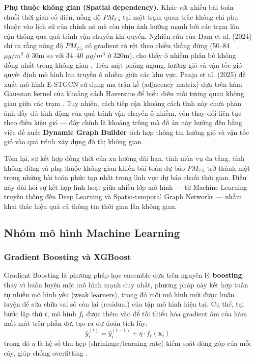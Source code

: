 \textbf{Phụ thuộc không gian (Spatial dependency).} Khác với nhiều bài toán chuỗi thời gian cổ điển, nồng độ $PM_{2.5}$ tại một trạm quan trắc không chỉ phụ thuộc vào lịch sử của chính nó mà còn chịu ảnh hưởng mạnh bởi các trạm lân cận thông qua quá trình vận chuyển khí quyển. Nghiên cứu của Dam et al. (2024) chỉ ra rằng nồng độ $PM_{2.5}$ có gradient rõ rệt theo chiều thẳng đứng (50--84 $\mu g/m^3$ ở 30m so với 34--40 $\mu g/m^3$ ở 320m), cho thấy ô nhiễm phân bố không đồng nhất trong không gian \cite{dam2024pm25}. Trên mặt phẳng ngang, hướng gió và vận tốc gió quyết định mô hình lan truyền ô nhiễm giữa các khu vực. Panja et al. (2025) đề xuất mô hình E-STGCN sử dụng ma trận kề (adjacency matrix) dựa trên hàm Gaussian kernel của khoảng cách Haversine để biểu diễn mối tương quan không gian giữa các trạm \cite{panja2025estgcn}. Tuy nhiên, cách tiếp cận khoảng cách tĩnh này chưa phản ánh đầy đủ tính động của quá trình vận chuyển ô nhiễm, vốn thay đổi liên tục theo điều kiện gió — đây chính là khoảng trống mà đồ án này hướng đến bằng việc đề xuất \textbf{Dynamic Graph Builder} tích hợp thông tin hướng gió và vận tốc gió vào quá trình xây dựng đồ thị không gian.

Tóm lại, sự kết hợp đồng thời của xu hướng dài hạn, tính mùa vụ đa tầng, tính không dừng và phụ thuộc không gian khiến bài toán dự báo $PM_{2.5}$ trở thành một trong những bài toán phức tạp nhất trong lĩnh vực dự báo chuỗi thời gian. Điều này đòi hỏi sự kết hợp linh hoạt giữa nhiều lớp mô hình — từ Machine Learning truyền thống đến Deep Learning và Spatio-temporal Graph Networks — nhằm khai thác hiệu quả cả thông tin thời gian lẫn không gian.

\subsection{Nhóm mô hình Machine Learning}
\subsubsection{Gradient Boosting và XGBoost}

Gradient Boosting là phương pháp học ensemble dựa trên nguyên lý \textbf{boosting}: thay vì huấn luyện một mô hình mạnh duy nhất, phương pháp này kết hợp tuần tự nhiều mô hình yếu (weak learners), trong đó mỗi mô hình mới được huấn luyện để sửa chữa sai số còn lại (residual) của tập mô hình hiện tại. Cụ thể, tại bước lặp thứ $t$, mô hình $f_t$ được thêm vào để tối thiểu hóa gradient âm của hàm mất mát trên phần dư, tạo ra dự đoán tích lũy:
\begin{equation}
    \hat{y}_i^{(t)} = \hat{y}_i^{(t-1)} + \eta \cdot f_t(\mathbf{x}_i)
\end{equation}
trong đó $\eta$ là hệ số thu hẹp (shrinkage/learning rate) kiểm soát đóng góp của mỗi cây, giúp chống overfitting \cite{Chen_2016}.

